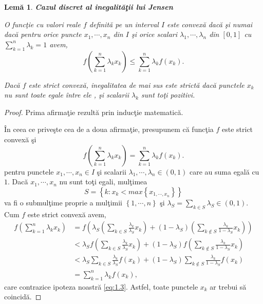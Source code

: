 \documentclass[a4paper,12pt,oneside]{report}
\newtheorem{lemma}{Lem\u{a}}
\begin{document}
\begin{lemma}
\textbf{Cazul discret al inegalit\u{a}\c{t}ii lui Jensen}

O func\c{t}ie cu valori reale \(f\) definit\u{a} pe un interval \(I\) este convex\u{a} dac\u{a} \c{s}i numai dac\u{a} pentru orice puncte \(x_{1},\cdots,x_{n}\) din \(I\) \c{s}i orice scalari \(\lambda _{1},\cdots,\lambda _{n}\) din \(\left [ 0 , 1 \right ]\) cu \(\sum_{k = 1}^{n}\lambda _{k}= 1\) avem,
\begin{displaymath}
  f\left ( \sum_{k = 1}^{n} \lambda _{k}x_{k}\right )\leq \sum_{k = 1}^{n}\lambda _{k}f\left ( x_{k} \right ).
\end{displaymath}

Dac\u{a} \(f\) este strict convex\u{a}, inegalitatea de mai sus este strict\u{a} dac\u{a} punctele \(x_{k}\) nu sunt toate egale \^{i}ntre ele , \c{s}i scalarii \(\lambda _{k}\) sunt to\c{t}i pozitivi.
\end{lemma}
\begin{proof}
Prima afirma\c{t}ie rezult\u{a} prin induc\c{t}ie matematic\u{a}.

\^{I}n ceea ce prive\c{s}te cea de a doua afirma\c{t}ie, presupunem c\u{a} func\c{t}ia \(f\) este strict convex\u{a} \c{s}i
\begin{displaymath}
  f\left ( \sum_{k = 1}^{n} \lambda _{k}x_{k}\right )=  \sum_{k = 1}^{n}\lambda _{k}f\left ( x_{k} \right ). \label{eq:1.3} \tag{1.3}
\end{displaymath}
pentru  punctele \(x_{1}, \cdots, x_{n} \in I\) \c{s}i scalarii \(\lambda _{1}, \cdots, \lambda _{n} \in \left ( 0 , 1\right )\) care au suma egal\u{a}  cu \(1\). Dac\u{a} \(x_{1}, \cdots, x_{n}\) nu sunt to\c{t}i egali, mul\c{t}imea
\[S = \left \{ k: x_{k}<  max \left \{ x_{1,\cdots,x_{n}} \right \} \right \}\]
 va fi o submul\c{t}ime proprie a mul\c{t}imii  \(\left \{ 1,\cdots,n \right \}\) \c{s}i \(\lambda _{S} = \sum_{k \in S}^{}\lambda _{S} \in \left ( 0,1 \right )\). Cum \(f\) este strict convex\u{a} avem,
 \begin{equation} \nonumber
     \begin{split}
         f\left ( \sum_{k=1}^{n}\lambda _{k}x_{k} \right ) & = f\left ( \lambda _{S}\left ( \sum_{k\in S}^{}\frac{\lambda _{k}}{\lambda _{S}} x_{k}\right ) +\left ( 1-\lambda _{S} \right )\left ( \sum_{k\notin S}^{} \frac{\lambda _{k}}{1 - \lambda _{S}}x_{k}\right )\right ) \\ & <\lambda _{S}f\left ( \sum_{k\in S}^{}\frac{\lambda _{k}}{\lambda _{S}} x_{k}\right ) +\left ( 1 - \lambda _{S} \right )f\left ( \sum_{k\notin S}^{}\frac{\lambda _{k}}{1 - \lambda _{S}} x_{k}\right ) \\ & <\lambda _{S} \sum_{k\in S}^{}\frac{\lambda _{k}}{\lambda _{S}} f\left ( x_{k} \right ) +\left ( 1 - \lambda _{S} \right ) \sum_{k\notin S}^{}\frac{\lambda _{k}}{1 - \lambda _{S}}f\left ( x_{k} \right ) \\ & = \sum_{k=1}^{n}\lambda _{k}f\left ( x_{k} \right ),
     \end{split}
 \end{equation}
care contrazice ipoteza noastr\u{a} \ref{eq:1.3}. Astfel, toate punctele \(x_{k}\) ar trebui s\u{a} coincid\u{a}.
\end{proof}
\end{document}
